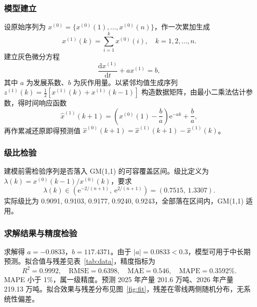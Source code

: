 \documentclass[12pt]{article}
\begin{document}
\subsubsection{模型建立}

设原始序列为 $x^{(0)} = \{x^{(0)}(1), \dots, x^{(0)}(n)\}$，作一次累加生成
\begin{equation}
x^{(1)}(k) = \sum_{i=1}^{k} x^{(0)}(i), \quad k = 1, 2, \dots, n .
\end{equation}
建立灰色微分方程
\begin{equation}
\frac{\mathrm{d} x^{(1)}}{\mathrm{d} t} + a x^{(1)} = b ,
\end{equation}
其中 $a$ 为发展系数、$b$ 为灰作用量。以紧邻均值生成序列 $z^{(1)}(k) = \tfrac{1}{2}\left[x^{(1)}(k) + x^{(1)}(k-1)\right]$ 构造数据矩阵，由最小二乘法估计参数，得时间响应函数
\begin{equation}
\hat{x}^{(1)}(k+1) = \left(x^{(0)}(1) - \frac{b}{a}\right) \mathrm{e}^{-ak} + \frac{b}{a} ,
\end{equation}
再作累减还原即得预测值 $\hat{x}^{(0)}(k+1) = \hat{x}^{(1)}(k+1) - \hat{x}^{(1)}(k)$。

\subsubsection{级比检验}

建模前需检验序列是否落入 GM(1,1) 的可容覆盖区间。级比定义为 $\lambda(k) = x^{(0)}(k-1) / x^{(0)}(k)$，要求
\begin{equation}
\lambda(k) \in \left(\mathrm{e}^{-2/(n+1)},\ \mathrm{e}^{2/(n+1)}\right) = (0.7515,\ 1.3307) .
\end{equation}
实际级比为 0.9091, 0.9103, 0.9177, 0.9240, 0.9243，全部落在区间内，GM(1,1) 适用。

\subsubsection{求解结果与精度检验}

求解得 $a = -0.0833$，$b = 117.4371$。由于 $|a| = 0.0833 < 0.3$，模型可用于中长期预测。拟合值与残差见表~\ref{tab:data}，精度指标为
\begin{equation}
R^2 = 0.9992, \quad \mathrm{RMSE} = 0.6398, \quad \mathrm{MAE} = 0.546, \quad \mathrm{MAPE} = 0.3592\% .
\end{equation}
MAPE 小于 1\%，属一级精度。预测 2025 年产量 201.6 万吨、2026 年产量 219.13 万吨。拟合效果与残差分布见图~\ref{fig:fit}，残差在零线两侧随机分布，无系统性偏差。
\end{document}
